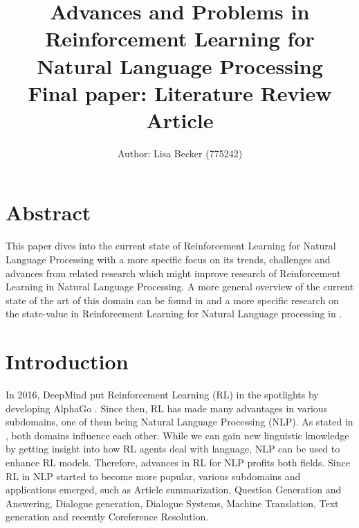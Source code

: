 \documentclass[11pt,a4paper]{article}
\title{{\LARGE Advances and Problems in Reinforcement Learning for Natural Language Processing}\\[1.5mm]
{\large Final paper: Literature Review Article}\\[1.5mm]}
\author{Author: Lisa Becker (775242) }
\begin{document}
\maketitle
\section{Abstract}
This paper dives into the current state of Reinforcement Learning for Natural Language Processing with a more specific focus on its trends, challenges and advances from related research which might improve research of Reinforcement Learning in Natural Language Processing. A more general overview of the current state of the art of this domain can be found in \citet{luketina-2019-asurvey} and a more specific research on the state-value in Reinforcement Learning for Natural Language processing in \citet{madureira2020}.

\section{Introduction}
In 2016, DeepMind put Reinforcement Learning (RL) in the spotlights by developing AlphaGo \citep{alphago}. Since then, RL has made many advantages in various subdomains, one of them being Natural Language Processing (NLP). As stated in \citet{ijcai2019}, both domains influence each other. While we can gain new linguistic knowledge by getting insight into how RL agents deal with language, NLP can be used to enhance RL models. Therefore, advances in RL for NLP profits both fields. Since RL in NLP started to become more popular, various subdomains and applications emerged, such as Article summarization, Question Generation and Answering, Dialogue generation, Dialogue Systems, Machine Translation, Text generation and recently Coreference Resolution. 
\end{document}
